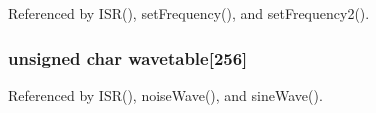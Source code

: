 Referenced by I\-S\-R(), set\-Frequency(), and set\-Frequency2().

\hypertarget{~main_8c_abc5f735c8235e23b42a484b2744e6a05}{
\subsubsection[{wavetable}]{\setlength{\rightskip}{0pt plus 5cm}unsigned char wavetable\mbox{[}256\mbox{]}}}\label{~main_8c_abc5f735c8235e23b42a484b2744e6a05}


Referenced by I\-S\-R(), noise\-Wave(), and sine\-Wave().

